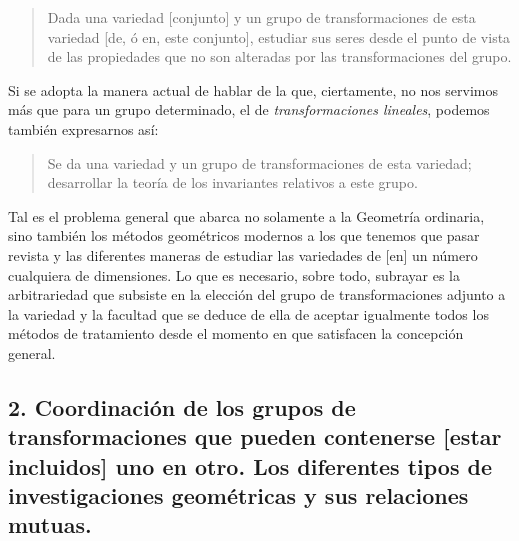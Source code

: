 \documentclass[a4paper, 12pt]{article}
\begin{document}
\begin{quote}\it 

Dada una variedad [conjunto] y un grupo de transformaciones de esta variedad [de, ó en, este conjunto], estudiar sus seres desde el punto de vista de las propiedades que no son alteradas por las transformaciones del grupo.

\end{quote}

Si se adopta la manera actual de hablar de la que, ciertamente, no nos servimos más que para un grupo determinado, el de \textit{transformaciones lineales}, podemos también expresarnos así: 

\begin{quote}\it 

Se da una variedad y un grupo de transformaciones de esta variedad; desarrollar la teoría de los invariantes relativos a este grupo.

\end{quote} 

Tal es el problema general que abarca no solamente a la Geometría ordinaria, sino también los métodos geométricos modernos a los que tenemos que pasar revista y las diferentes maneras de estudiar las variedades de [en] un número cualquiera de dimensiones. Lo que es necesario, sobre todo, subrayar es la arbitrariedad que subsiste en la elección del grupo de transformaciones adjunto a la variedad y la facultad que se deduce de ella de aceptar igualmente todos los métodos de tratamiento desde el momento en que satisfacen la concepción general. 

 \subsection*{2.  Coordinación de los grupos de transformaciones que pueden contenerse [estar incluidos] uno en otro. Los diferentes tipos de investigaciones geométricas y sus relaciones mutuas.} 
\end{document}
